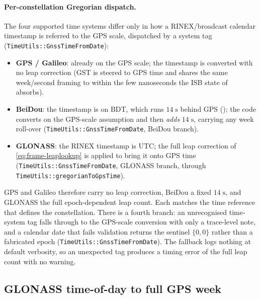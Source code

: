 \documentclass[main.tex]{subfiles}
\begin{document}
\paragraph{Per-constellation Gregorian dispatch.}
The four supported time systems differ only in how a RINEX/broadcast
calendar timestamp is referred to the GPS scale, dispatched by a system
tag (\texttt{TimeUtils::GnssTimeFromDate}):
\begin{itemize}
  \item \textbf{GPS / Galileo}: already on the GPS scale; the
    timestamp is converted with no leap correction (GST is steered to
    GPS time and shares the same week/second framing to within the few
    nanoseconds the ISB state of  absorbs).
  \item \textbf{BeiDou}: the timestamp is on BDT, which runs
    $14\;\mathrm{s}$ behind GPS (); the code converts
    on the GPS-scale assumption and then \emph{adds} $14\;\mathrm{s}$,
    carrying any week roll-over
    (\texttt{TimeUtils::GnssTimeFromDate}, BeiDou branch).
  \item \textbf{GLONASS}: the RINEX timestamp is UTC; the full leap
    correction of \eqref{eq:frame-leaplookup} is applied to bring it onto
    GPS time (\texttt{TimeUtils::GnssTimeFromDate}, GLONASS branch, through
    \texttt{TimeUtils::gregorianToGpsTime}).
\end{itemize}
GPS and Galileo therefore carry no leap correction, BeiDou a fixed
$14\;\mathrm{s}$, and GLONASS the full epoch-dependent leap count.  Each
matches the time reference that defines the constellation.  There is a
fourth branch: an unrecognised time-system tag
falls through to the GPS-scale conversion with only a trace-level note,
and a calendar date that fails validation returns the sentinel
$\{0,0\}$ rather than a fabricated epoch
(\texttt{TimeUtils::GnssTimeFromDate}).  The fallback logs nothing at
default verbosity, so an unexpected tag produces a timing error of the
full leap count with no warning.

\subsection{GLONASS time-of-day to full GPS week}
\label{sec:frame-glonass}
\end{document}

